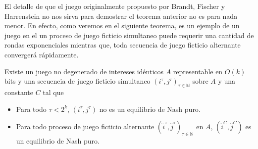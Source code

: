 El detalle de que el juego originalmente propuesto por Brandt, Fischer y Harrenstein no nos sirva para demostrar el teorema anterior no es para nada menor. En efecto, como veremos en el siguiente teorema, es un ejemplo de un juego en el un proceso de juego ficticio simultaneo puede requerir una cantidad de rondas exponenciales mientras que, toda secuencia de juego ficticio alternante convergerá rápidamente.

\begin{theorem} \label{teorema:afp:mejor}
    Existe un juego no degenerado de intereses idénticos $A$ representable en $O(k)$ bits y una secuencia de juego ficticio simultaneo $(i^\tau, j^\tau)_{\tau \in \mathbb{N}}$ sobre $A$ y una constante $C$ tal que
    \begin{itemize}
        \item Para todo $\tau < 2^k$, $(i^\tau, j^\tau)$ no es un equilibrio de Nash puro.
        \item Para todo proceso de juego ficticio alternante $(\widehat{i}^\tau, \widehat{j}^\tau)_{\tau \in \mathbb{N}}$ en $A$, $(\widehat{i}^C, \widehat{j}^C)$ es un equilibrio de Nash puro.
    \end{itemize}
\end{theorem}


